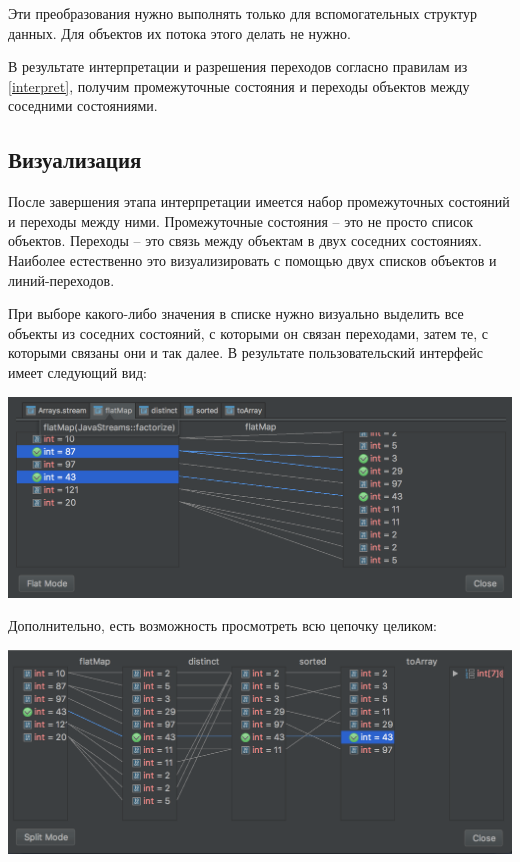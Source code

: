 Эти преобразования нужно выполнять только для вспомогательных структур данных. Для объектов их потока этого делать не нужно.

В результате интерпретации и разрешения переходов согласно правилам из \ref{interpret}, получим промежуточные состояния и переходы объектов между соседними состояниями.

\subsection{Визуализация}
После завершения этапа интерпретации имеется набор промежуточных состояний и переходы между ними. Промежуточные состояния -- это не просто список объектов. Переходы -- это связь между объектам в двух соседних состояниях. Наиболее естественно это визуализировать с помощью двух списков объектов и линий-переходов.

При выборе какого-либо значения в списке нужно визуально выделить все объекты из соседних состояний, с которыми он связан переходами, затем те, с которыми связаны они и так далее. 
\newpage
В результате пользовательский интерфейс имеет следующий вид:

\includegraphics[scale=0.25]{chapter3/img/split-view.png}

Дополнительно, есть возможность просмотреть всю цепочку целиком:

\includegraphics[scale=0.36]{chapter3/img/flat-view.png}










